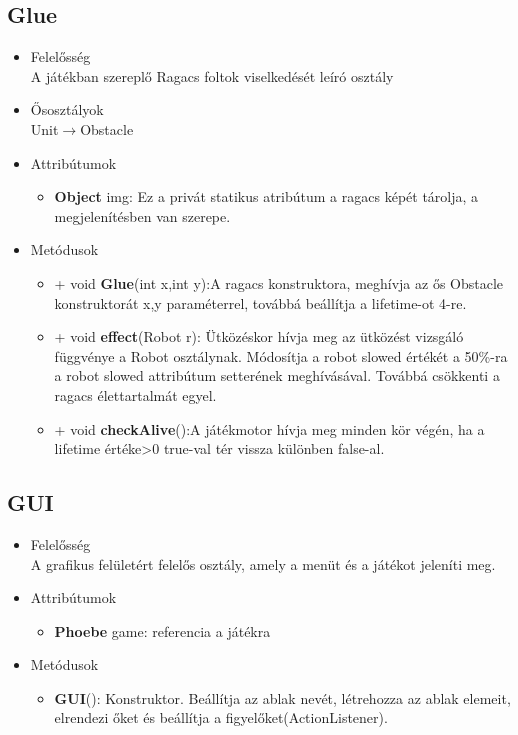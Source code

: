 \subsection{Glue}
\begin{itemize}
\item Felelősség\\
A játékban szereplő Ragacs foltok viselkedését leíró osztály
\item Ősosztályok\\
Unit$\rightarrow$Obstacle
\item Attribútumok
	\begin{itemize}
		\item \textbf{Object} img: Ez a privát statikus atribútum a ragacs képét tárolja,                                      a megjelenítésben van szerepe.
	\end{itemize}
\item Metódusok
	\begin{itemize}
	    \item + void \textbf{Glue}(int x,int y):A ragacs konstruktora, meghívja az ős Obstacle konstruktorát x,y paraméterrel, továbbá beállítja a lifetime-ot 4-re.
		\item + void \textbf{effect}(Robot r): Ütközéskor hívja meg az ütközést vizsgáló függvénye a Robot osztálynak. Módosítja a robot slowed értékét a 50\%-ra a robot slowed attribútum setterének meghívásával. Továbbá csökkenti a ragacs élettartalmát egyel.	
		\item + void \textbf{checkAlive}():A játékmotor hívja meg minden kör végén, ha a lifetime értéke>0 true-val tér vissza különben false-al.
	\end{itemize}
\end{itemize}

\subsection{GUI}
\begin{itemize}
\item Felelősség\\
A grafikus felületért felelős osztály, amely a menüt és a játékot jeleníti meg.
\item Attribútumok
	\begin{itemize}
		\item \textbf{Phoebe} game: referencia a játékra
	\end{itemize}
\item Metódusok
	\begin{itemize}
		\item\textbf{GUI}(): Konstruktor. Beállítja az ablak nevét, létrehozza az ablak elemeit, elrendezi őket és beállítja a figyelőket(ActionListener).
	\end{itemize}
\end{itemize}

